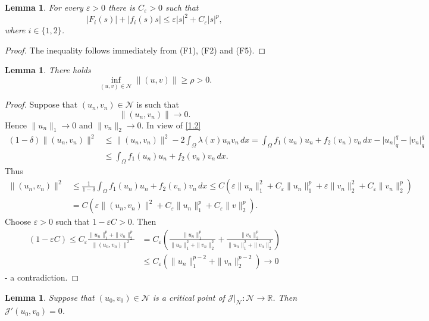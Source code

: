 \documentclass{scrartcl}
\newtheorem{Lem}[Th]{Lemma}
\newcommand{\cJ}{{\mathcal J}}
\newcommand{\cN}{{\mathcal N}}
\newcommand{\R}{\mathbb{R}}
\numberwithin{equation}{section}
\begin{document}
\begin{Lem}\label{lem:1.4}
For every $\varepsilon > 0$ there is $C_\varepsilon > 0$ such that
$$
|F_i (s)| + |f_i (s)s| \leq \varepsilon |s|^2 + C_\varepsilon |s|^p,
$$
where $i \in \{1,2\}$.
\end{Lem}

\begin{proof}
The inequality follows immediately from (F1), (F2) and (F5).
\end{proof}

\begin{Lem}\label{lem:1.5}
There holds
$$
\inf_{(u,v) \in \cN} \| (u,v) \| \geq \rho > 0.
$$
\end{Lem}

\begin{proof}
Suppose that $(u_n,v_n) \in \cN$ is such that
$$
\|(u_n,v_n)\| \to 0.
$$
Hence $\|u_n\|_1 \to 0$ and $\|v_n\|_2 \to 0$.
In view of \eqref{1.2}
\begin{align*}
(1 - \delta) \|(u_n,v_n)\|^2 &\leq \|(u_n,v_n)\|^2 - 2 \int_{\Omega} \lambda(x)u_n v_n \, dx = \int_{\Omega} f_1(u_n)u_n + f_2(v_n)v_n \, dx - |u_n|_q^q - |v_n|_q^q \\ &\leq \int_{\Omega} f_1(u_n)u_n + f_2(v_n)v_n \, dx.
\end{align*}
Thus
\begin{align*}
\|(u_n,v_n)\|^2 &\leq \frac{1}{1-\delta} \int_{\Omega} f_1(u_n)u_n + f_2(v_n)v_n \, dx \leq C \left( \varepsilon\|u_n\|_1^2 + C_\varepsilon \|u_n\|_1^p + \varepsilon\|v_n\|_2^2 + C_\varepsilon \|v_n\|_2^p \right) \\ &= C \left( \varepsilon \|(u_n,v_n)\|^2 + C_\varepsilon \|u_n\|_1^p + C_\varepsilon \|v\|_2^p \right).
\end{align*}
Choose $\varepsilon > 0$ such that $1 - \varepsilon C > 0$. Then
\begin{align*}
(1 - \varepsilon C) \leq C_\varepsilon \frac{\|u_n\|_1^p + \|v_n\|_2^p}{\|(u_n, v_n)\|^2} &= C_\varepsilon \left( \frac{\|u_n\|_1^p}{\|u_n\|_1^2 + \|v_n\|_2^2} + \frac{\|v_n\|_2^p}{\|u_n\|_1^2 + \|v_n\|_2^2} \right) \\ &\leq C_\varepsilon \left( \|u_n\|_1^{p-2} + \|v_n\|_2^{p-2} \right) \to 0
\end{align*}
- a contradiction.
\end{proof}

\begin{Lem}\label{lem:2.6}
Suppose that $(u_0,v_0) \in \cN$ is a critical point of $\cJ \Big|_\cN : \cN \rightarrow \R$. Then $\cJ'(u_0,v_0) = 0$. 
\end{Lem}
\end{document}

